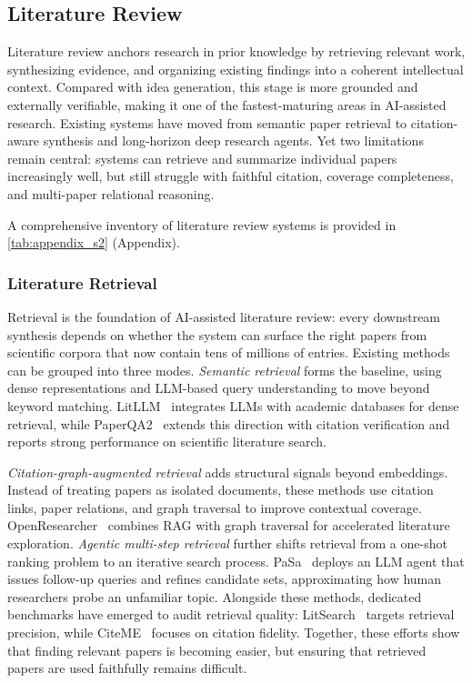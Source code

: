 \vspace{8pt}



\subsection{Literature Review}
\label{sec:literature_review}

Literature review anchors research in prior knowledge by retrieving relevant work, synthesizing evidence, and organizing existing findings into a coherent intellectual context. Compared with idea generation, this stage is more grounded and externally verifiable, making it one of the fastest-maturing areas in AI-assisted research. Existing systems have moved from semantic paper retrieval to citation-aware synthesis and long-horizon deep research agents. Yet two limitations remain central: systems can retrieve and summarize individual papers increasingly well, but still struggle with faithful citation, coverage completeness, and multi-paper relational reasoning. 

A comprehensive inventory of literature review systems is provided in \cref{tab:appendix_s2} (Appendix).


\subsubsection{Literature Retrieval}
\label{sec:lit_retrieval}

Retrieval is the foundation of AI-assisted literature review: every downstream synthesis depends on whether the system can surface the right papers from scientific corpora that now contain tens of millions of entries. Existing methods can be grouped into three modes. \emph{Semantic retrieval} forms the baseline, using dense representations and LLM-based query understanding to move beyond keyword matching. LitLLM~\cite{agarwal2024litllm} integrates LLMs with academic databases for dense retrieval, while PaperQA2~\cite{skarlinski2024paperqa2} extends this direction with citation verification and reports strong performance on scientific literature search.

\emph{Citation-graph-augmented retrieval} adds structural signals beyond embeddings. Instead of treating papers as isolated documents, these methods use citation links, paper relations, and graph traversal to improve contextual coverage. OpenResearcher~\cite{li2024openresearcher} combines RAG with graph traversal for accelerated literature exploration. \emph{Agentic multi-step retrieval} further shifts retrieval from a one-shot ranking problem to an iterative search process. PaSa~\cite{pasa2025} deploys an LLM agent that issues follow-up queries and refines candidate sets, approximating how human researchers probe an unfamiliar topic. Alongside these methods, dedicated benchmarks have emerged to audit retrieval quality: LitSearch~\cite{litsearch2024} targets retrieval precision, while CiteME~\cite{citeme2024} focuses on citation fidelity. Together, these efforts show that finding relevant papers is becoming easier, but ensuring that retrieved papers are used faithfully remains difficult.



